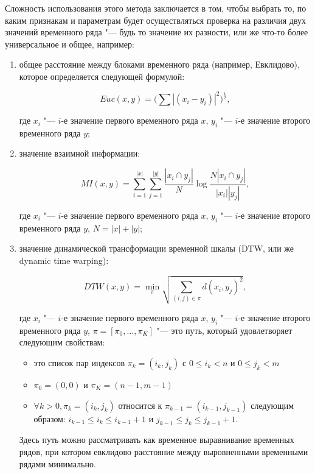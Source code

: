 \documentclass[bachelor, och, referat]{../shiza}
\begin{document}
        Сложность использования этого метода заключается в том, чтобы выбрать
        то, по каким признакам и параметрам будет осуществляться проверка на
        различия двух значений временного ряда "--- будь то значение их
        разности, или же что-то более универсальное и общее, например: 

        \begin{enumerate}
            \item общее расстояние между блоками временного ряда (например,
            Евклидово), которое определяется следующей формулой:

            $$Euc(x, y) = \bigg(\sum |(x_i - y_i)|^2 \bigg)^\frac{1}{2},$$
            
            где $x_i$ "--- $i$-е значение первого временного ряда $x$, $y_i$
            "--- $i$-е значение второго временного ряда $y$;

            \item значение взаимной информации:
    
            $$MI(x,y)=\sum_{i=1}^{|x|} \sum_{j=1}^{|y|} \frac{|x_i\cap y_j|}{N}
            \log\frac{N|x_i \cap y_j|}{|x_i||y_j|},$$

            где $x_i$ "--- $i$-е значение первого временного ряда $x$, $y_i$
            "--- $i$-е значение второго временного ряда $y$, $N = |x| + |y|$;

            \item значение динамической трансформации временной шкалы (DTW, или
            же dynamic time warping):

            $$DTW(x, y) = \min_\pi \sqrt{ \sum_{(i, j) \in \pi} d(x_i, y_j)^2
            },$$

            где $x_i$ "--- $i$-е значение первого временного ряда $x$, $y_i$
            "--- $i$-е значение второго временного ряда $y$, $\pi = [\pi_0,
            \dots , \pi_K]$ "--- это путь, который удовлетворяет следующим
            свойствам:

            \begin{itemize}
                \item это список пар индексов $\pi_k = (i_k, j_k)$ с $0 \leq i_k
                < n$ и $0 \leq j_k < m$
                \item $\pi_0 = (0, 0)$ и $\pi_K = (n - 1, m - 1)$
                \item $\forall k > 0, \pi_k = (i_k, j_k)$ относится к $\pi_{k-1}
                = (i_{k-1}, j_{k-1})$ следующим образом: $i_{k-1} \leq i_k \leq
                i_{k-1} + 1$ и $j_{k-1} \leq j_k \leq j_{k-1} + 1$.
            \end{itemize}

            Здесь путь можно рассматривать как временное выравнивание временных
            рядов, при котором евклидово расстояние между выровненными
            временными рядами минимально.


        \end{enumerate}
        
\end{document}
